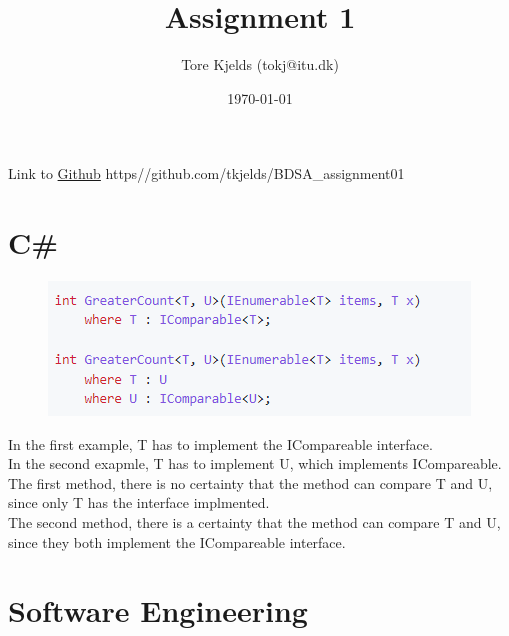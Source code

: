\documentclass{article}
\title{Assignment 1}
\author{Tore Kjelds (tokj@itu.dk)}
\date{\today}
\begin{document}
\maketitle
Link to \href{https://github.com/tkjelds/BDSA_assignment01}{Github} \: https\://github.com/tkjelds/BDSA\_assignment01 \\
\section*{C\#}
\begin{figure}[!htb]
    \begin{center}
        \includegraphics[scale = 0.7]{img/GreaterCount.png}
    \end{center}
\end{figure}
In the first example, T has to implement the ICompareable interface. \\
In the second exapmle, T has to implement U, which implements ICompareable. \\ 
The first method, there is no certainty that the method can compare T and U, since only T has the interface implmented. \\
The second method, there is a certainty that the method can compare T and U, since they both implement the ICompareable interface. \\ 
\newpage
\section*{Software Engineering}
\end{document}
